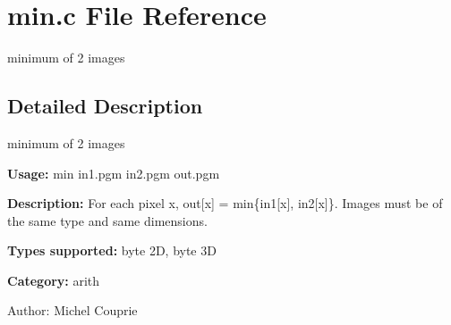 \section{min.c File Reference}
\label{min_8c}
minimum of 2 images  




\label{_details}
\subsection{Detailed Description}
minimum of 2 images 

{\bf Usage:} min in1.pgm in2.pgm out.pgm

{\bf Description:} For each pixel x, out[x] = min\{in1[x], in2[x]\}. Images must be of the same type and same dimensions.

{\bf Types supported:} byte 2D, byte 3D

{\bf Category:} arith

\begin{Desc}
\item[Author:]Michel Couprie \end{Desc}
